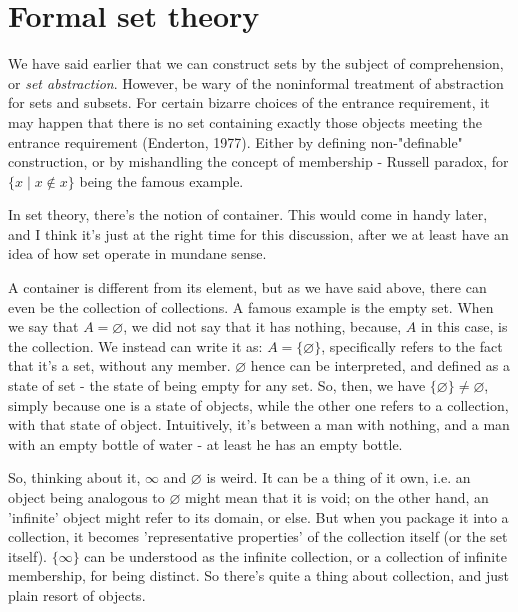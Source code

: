 \section{Formal set theory}
We have said earlier that we can construct sets by the subject of comprehension, or \textit{set abstraction}. However, be wary of the noninformal treatment of abstraction for sets and subsets. For certain bizarre choices of the entrance requirement, it may happen that there is no set containing exactly those objects meeting the entrance requirement (Enderton, 1977). Either by defining non-"definable" construction, or by mishandling the concept of membership - Russell paradox, for $\{x\mid x\not\in x\}$ being the famous example. 

In set theory, there's the notion of container. This would come in handy later, and I think it's just at the right time for this discussion, after we at least have an idea of how set operate in mundane sense. 

A container is different from its element, but as we have said above, there can even be the collection of collections. A famous example is the empty set. When we say that $A=\varnothing$, we did not say that it has nothing, because, $A$ in this case, is the collection. We instead can write it as: $A= \{\varnothing\}$, specifically refers to the fact that it's a set, without any member. $\varnothing$ hence can be interpreted, and defined as a state of set - the state of being empty for any set. So, then, we have $\{\varnothing\}\neq \varnothing$, simply because one is a state of objects, while the other one refers to a collection, with that state of object. Intuitively, it's between a man with nothing, and a man with an empty bottle of water - at least he has an empty bottle. 

So, thinking about it, $\infty$ and $\varnothing$ is weird. It can be a thing of it own, i.e. an object being analogous to $\varnothing$ might mean that it is void; on the other hand, an 'infinite' object might refer to its domain, or else. But when you package it into a collection, it becomes 'representative properties' of the collection itself (or the set itself). $\{\infty\}$ can be understood as the infinite collection, or a collection of infinite membership, for being distinct. So there's quite a thing about collection, and just plain resort of objects. 

